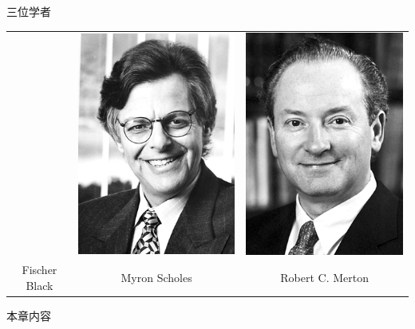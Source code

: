\documentclass[t]{beamer}
\begin{document}
\begin{frame}{三位学者}
\begin{center}
\begin{tabular}{ccc}
& \includegraphics[height=0.4\textheight]{fig/Scholes.jpg}& \includegraphics[height=0.4\textheight]{fig/Merton.jpg}\\
Fischer Black & Myron Scholes & Robert C. Merton
\end{tabular}
\end{center}

\end{frame}




\begin{frame}{本章内容}
\tableofcontents

\end{frame}
\end{document}
